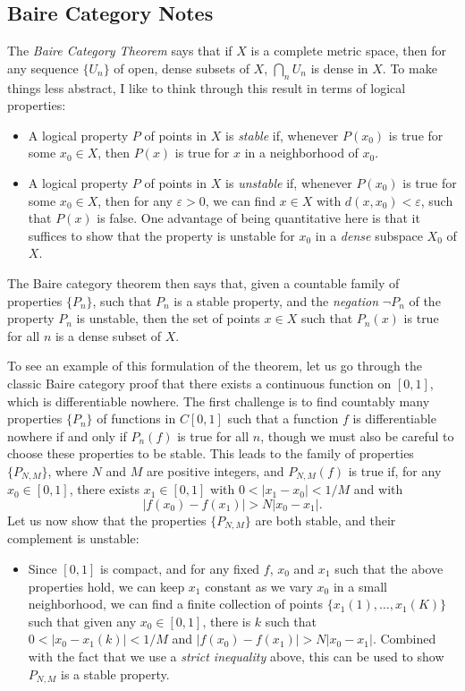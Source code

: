 \documentclass{exam}
\theoremstyle{problemstyle}
\newcommand{\1}[1]{\textbf{1}_{\left[#1\right]}} %
\begin{document}
\begin{questions}
\newpage
\section{Baire Category Notes}

The \emph{Baire Category Theorem} says that if $X$ is a complete metric space, then for any sequence $\{ U_n \}$ of open, dense subsets of $X$, $\bigcap_n U_n$ is dense in $X$. To make things less abstract, I like to think through this result in terms of logical properties:
%
\begin{itemize}
	\item A logical property $P$ of points in $X$ is \emph{stable} if, whenever $P(x_0)$ is true for some $x_0 \in X$, then $P(x)$ is true for $x$ in a neighborhood of $x_0$.

	\item A logical property $P$ of points in $X$ is \emph{unstable} if, whenever $P(x_0)$ is true for some $x_0 \in X$, then for any $\varepsilon > 0$, we can find $x \in X$ with $d(x,x_0) < \varepsilon$, such that $P(x)$ is false. One advantage of being quantitative here is that it suffices to show that the property is unstable for $x_0$ in a \emph{dense} subspace $X_0$ of $X$.
\end{itemize}
%
The Baire category theorem then says that, given a countable family of properties $\{ P_n \}$, such that $P_n$ is a stable property, and the \emph{negation} $\neg P_n$ of the property $P_n$ is unstable, then the set of points $x \in X$ such that $P_n(x)$ is true for all $n$ is a dense subset of $X$.

To see an example of this formulation of the theorem, let us go through the classic Baire category proof that there exists a continuous function on $[0,1]$, which is differentiable nowhere. The first challenge is to find countably many properties $\{ P_n \}$ of functions in $C[0,1]$ such that a function $f$ is differentiable nowhere if and only if $P_n(f)$ is true for all $n$, though we must also be careful to choose these properties to be stable. This leads to the family of properties $\{ P_{N,M} \}$, where $N$ and $M$ are positive integers, and $P_{N,M}(f)$ is true if, for any $x_0 \in [0,1]$, there exists $x_1 \in [0,1]$ with $0 < |x_1 - x_0| < 1/M$ and with
%
\[ |f(x_0) - f(x_1)| > N|x_0 - x_1|. \]
%
Let us now show that the properties $\{ P_{N,M} \}$ are both stable, and their complement is unstable:
%
\begin{itemize}
	\item Since $[0,1]$ is compact, and for any fixed $f$, $x_0$ and $x_1$ such that the above properties hold, we can keep $x_1$ constant as we vary $x_0$ in a small neighborhood, we can find a finite collection of points $\{ x_1(1),\dots, x_1(K) \}$ such that given any $x_0 \in [0,1]$, there is $k$ such that $0 < |x_0 - x_1(k)| < 1/M$ and $|f(x_0) - f(x_1)| > N|x_0 - x_1|$. Combined with the fact that we use a \emph{strict inequality} above, this can be used to show $P_{N,M}$ is a stable property.


\end{itemize}
\end{questions}
\end{document}
